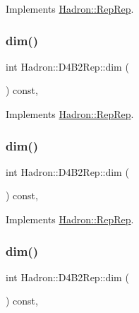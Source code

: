 Implements \mbox{\hyperlink{structHadron_1_1RepRep_a92c8802e5ed7afd7da43ccfd5b7cd92b}{Hadron\+::\+Rep\+Rep}}.

\mbox{\label{structHadron_1_1D4B2Rep_a0a06eb2f05e5c89bb898a325aeff1793}} 
\subsubsection{\texorpdfstring{dim()}{dim()}\hspace{0.1cm}{\footnotesize\ttfamily [3/5]}}
{\footnotesize\ttfamily int Hadron\+::\+D4\+B2\+Rep\+::dim (\begin{DoxyParamCaption}{ }\end{DoxyParamCaption}) const\hspace{0.3cm}{\ttfamily [inline]}, {\ttfamily [virtual]}}



Implements \mbox{\hyperlink{structHadron_1_1RepRep_a92c8802e5ed7afd7da43ccfd5b7cd92b}{Hadron\+::\+Rep\+Rep}}.

\mbox{\label{structHadron_1_1D4B2Rep_a0a06eb2f05e5c89bb898a325aeff1793}} 
\subsubsection{\texorpdfstring{dim()}{dim()}\hspace{0.1cm}{\footnotesize\ttfamily [4/5]}}
{\footnotesize\ttfamily int Hadron\+::\+D4\+B2\+Rep\+::dim (\begin{DoxyParamCaption}{ }\end{DoxyParamCaption}) const\hspace{0.3cm}{\ttfamily [inline]}, {\ttfamily [virtual]}}



Implements \mbox{\hyperlink{structHadron_1_1RepRep_a92c8802e5ed7afd7da43ccfd5b7cd92b}{Hadron\+::\+Rep\+Rep}}.

\mbox{\label{structHadron_1_1D4B2Rep_a0a06eb2f05e5c89bb898a325aeff1793}} 
\subsubsection{\texorpdfstring{dim()}{dim()}\hspace{0.1cm}{\footnotesize\ttfamily [5/5]}}
{\footnotesize\ttfamily int Hadron\+::\+D4\+B2\+Rep\+::dim (\begin{DoxyParamCaption}{ }\end{DoxyParamCaption}) const\hspace{0.3cm}{\ttfamily [inline]}, {\ttfamily [virtual]}}



